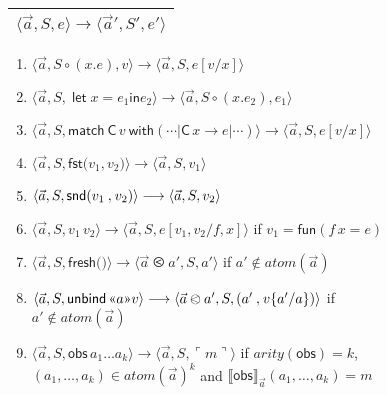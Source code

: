 \documentclass{LMCS}
\theoremstyle{plain}
\theoremstyle{definition}
\newcommand{\ALT}{\mathrel{\kw{|}}}
\newcommand{\arity}{\mathit{arity}}
\newcommand{\atm}[1][a]{#1}
\newcommand{\atoms}{\mathit{atom}}
\newcommand{\BINDVAL}[2]{\mathopen{\text{\normalfont\guillemotleft}}#1
  \mathclose{\text{\normalfont\guillemotright}}#2}
\newcommand{\comp}{\circ}
\newcommand{\CON}[1][C]{\kw{#1}}
\newcommand{\config}[3]{\langle#1, #2, #3\rangle}
\newcommand{\den}[1]{\llbracket#1\rrbracket}\newcommand{\DIVERGE}{\kw{diverge}}
\newcommand{\EQ}{\mathbin{\kw{=}}}
\renewcommand{\exp}[1][e]{#1}
\newcommand{\FRESH}{\kw{fresh}}
\newcommand{\FST}{\kw{fst}}
\newcommand{\FUN}{\kw{fun}}
\newcommand{\IN}{\mathrel{\kw{in}}}
\newcommand{\LET}{\mathop{\kw{let}}}
\newcommand{\LP}{\mathopen{\kw{(}}}
\newcommand{\kw}[1]{\mathsf{#1}}
\newcommand{\MATCH}{\kw{match}}
\newcommand{\OBS}[1][obs]{\kw{#1}}
\newcommand{\ords}{\olessthan}\newcommand{\PAIR}[2]{\LP#1\mathbin{\kw{,}}#2\RP}
\newcommand{\rename}[2]{\{#2/#1\}}
\newcommand{\rep}[1]{\ulcorner#1\urcorner}
\newcommand{\RP}{\mathclose{\kw{)}}}
\newcommand{\s}[1][a]{\vec{#1}}
\newcommand{\stk}[1][S]{#1}
\newcommand{\sub}[2]{{[#2/#1]}}
\newcommand{\TO}{\mathbin{\rightarrow}}
\newcommand{\trans}{\longrightarrow}
\newcommand{\UNBIND}{\kw{unbind}}
\newcommand{\UNITVAL}{\LP\RP}
\newcommand{\val}[1][v]{#1}
\newcommand{\vid}[1][x]{#1}
\newcommand{\WITH}{\mathbin{\kw{with}}}
\begin{document}
\begin{figure}\small
  \renewcommand{\arraystretch}{1.5}
  \begin{center}
    \begin{tabular}{|c|}
      \hline
      $\config{\s}{\stk}{\exp} \trans
      \config{\s'}{\stk'}{\exp'}$\\\hline
    \end{tabular}
  \end{center}
  \begin{enumerate}
    
  \item\label{item:1} $\config{\s}{\stk\comp(\vid.\exp)}{\val}
    \trans \config{\s}{\stk}{\exp\sub{\vid}{\val}}$
    
  \item\label{item:2} $\config{\s}{\stk}{\LET{\vid\EQ\exp_1} \IN
      \exp_2} \trans \config{\s}{\stk\comp(\vid.\exp_2)}{\exp_1}$
    
  \item\label{item:3} $\config{\s}{\stk}{\MATCH\ \CON\,\val\ \WITH
      (\cdots\ALT\CON\,\vid\TO \exp\ALT\cdots)} {} \trans
    \config{\s}{\stk}{\exp\sub{\vid}{\val}}$
    
  \item\label{item:4}
    $\config{\s}{\stk}{\FST\PAIR{\val_1}{\val_2}} \trans
    \config{\s}{\stk}{\val_1}$
    
  \item\label{item:5}
    $\config{\s}{\stk}{\SND\PAIR{\val_1}{\val_2}} \trans
    \config{\s}{\stk}{\val_2}$
    
  \item\label{item:6} $\config{\s}{\stk}{\val_1\,\val_2} \trans
    \config{\s}{\stk}{\exp\sub{\vid[f],\vid}{\val_1,\val_2}}$ if
    $\val_1=\FUN(\vid[f]\,\vid\EQ \exp)$
    
  \item\label{item:7} $\config{\s}{\stk}{\FRESH\UNITVAL} \trans
    \config{\s\ords\atm'}{\stk}{\atm'}$ if
    $\atm'\notin\atoms(\s)$
    
  \item\label{item:8}
    $\config{\s}{\stk}{\UNBIND\,\BINDVAL{\atm}{\val}} \trans
    \config{\s\ords\atm'}{\stk}{\PAIR{\atm'}{\val\rename{\atm}{\atm'}}}$
    if $\atm'\notin\atoms(\s)$
    
  \item\label{item:9}\raggedright
    $\config{\s}{\stk}{\OBS\,\atm_1\ldots\atm_k} \trans
    \config{\s}{\stk}{\rep{m}}$ if $\arity(\OBS)=k$,
    $(\atm_1,\ldots,\atm_k)\in \atoms(\s)^k$ and
    $\den{\OBS}_{\s}(\atm_1,\ldots,\atm_k) = m$
    

\end{enumerate}
\end{figure}
\end{document}
